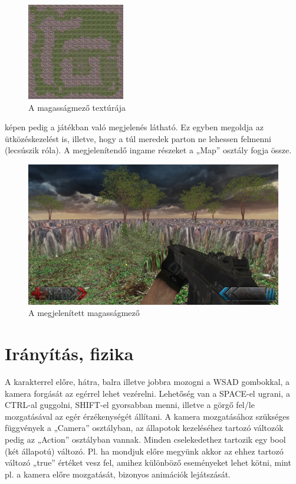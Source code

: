 \begin{figure}[h]
\centering
\includegraphics[scale=1.6]{kepek/heightmap_texture.png}
\caption{A magasságmező textúrája}
\label{fig:heightmap_texture}
\end{figure}

 képen pedig a játékban való megjelenés látható. Ez egyben megoldja az ütközéskezelést is, illetve, hogy a túl meredek parton ne lehessen felmenni (lecsúszik róla). A megjelenítendő ingame részeket a „Map” osztály fogja össze.

\begin{figure}[h]
\centering
\includegraphics[scale=0.4]{kepek/screenshot.png}
\caption{A megjelenített magasságmező}
\label{fig:screenshot}
\end{figure}

\section{Irányítás, fizika}

A karakterrel előre, hátra, balra illetve jobbra mozogni a WSAD gombokkal, a kamera forgását az egérrel lehet vezérelni. Lehetőség van a SPACE-el ugrani, a CTRL-al guggolni, SHIFT-el gyorsabban menni, illetve a görgő fel/le mozgatásával az egér érzékenységét állítani. A kamera mozgatásához szükséges függvények a „Camera” osztályban, az állapotok kezeléséhez tartozó változók pedig az „Action” osztályban vannak. Minden cselekedethez tartozik egy bool (két állapotú) változó. Pl. ha mondjuk előre megyünk akkor az ehhez tartozó változó „true” értéket vesz fel, amihez különböző eseményeket lehet kötni, mint pl. a kamera előre mozgatását, bizonyos animációk lejátszását.

